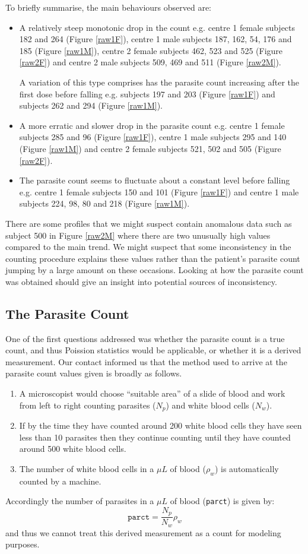 \pagebreak
To briefly summarise, the main behaviours observed are:
\begin{itemize}
\item A relatively steep monotonic drop in the count e.g. centre 1 female subjects 182 and 264 (Figure \ref{raw1F}), centre 1 male subjects 187, 162, 54, 176 and 185 (Figure \ref{raw1M}), centre 2 female subjects 462, 523 and 525 (Figure \ref{raw2F}) and centre 2 male subjects 509, 469 and 511 (Figure \ref{raw2M}).

A variation of this type comprises has the parasite count increasing after the first dose before falling e.g. subjects 197 and 203 (Figure \ref{raw1F}) and subjects 262 and 294 (Figure \ref{raw1M}). 
\item A more erratic and slower drop in the parasite count e.g. centre 1 female subjects 285 and 96 (Figure \ref{raw1F}), centre 1 male subjects 295 and 140 (Figure \ref{raw1M}) and centre 2 female subjects 521, 502 and 505 (Figure \ref{raw2F}). 
\item The parasite count seems to fluctuate about a constant level before falling e.g. centre 1 female subjects 150 and 101 (Figure \ref{raw1F}) and centre 1 male subjects 224, 98, 80 and 218 (Figure \ref{raw1M}). 
\end{itemize}
There are some profiles that we might suspect contain anomalous data such as subject 500 in Figure \ref{raw2M} where there are two unusually high values compared to the main trend. We might suspect that some inconsistency in the counting procedure explains these values rather than the patient's parasite count jumping by a large amount on these occasions. Looking at how the parasite count was obtained should give an insight into potential sources of inconsistency.
\subsection{The Parasite Count}
One of the first questions addressed was whether the parasite count is a true count, and thus Poission statistics would be applicable, or whether it is a derived measurement. Our contact informed us that the method used to arrive at the parasite count values given is broadly as follows.
\begin{enumerate}
 \item A microscopist would choose ``suitable area'' of a slide of blood and work from left to right counting parasites ($N_p$) and white blood cells ($N_w$).
\item If by the time they have counted around 200 white blood cells they have seen less than 10 parasites then they continue counting until they have counted around 500 white blood cells.
\item The number of white blood cells in a $\mu L$ of blood ($\rho_w$) is automatically counted by a machine.
\end{enumerate}
Accordingly the number of parasites in a $\mu L$ of blood (\texttt{parct}) is given by:
$$\mathtt{parct}=\frac{N_p}{N_w}\rho_w$$
and thus we cannot treat this derived measurement as a count for modeling purposes.

